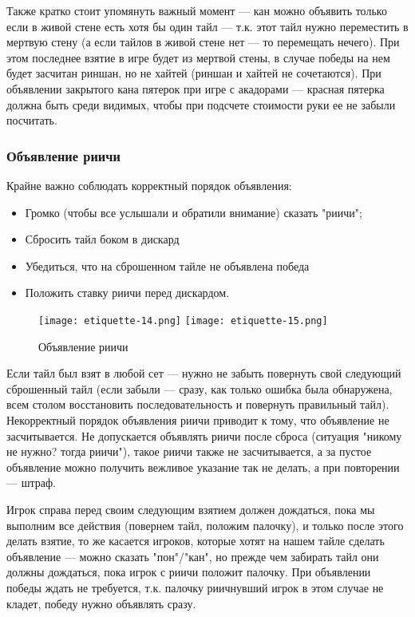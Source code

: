 Также кратко стоит упомянуть важный момент --- кан можно объявить только если в живой стене есть хотя бы один тайл --- т.к. этот тайл нужно переместить в мертвую стену (а если тайлов в живой стене нет --- то перемещать нечего). При этом последнее взятие в игре будет из мертвой стены, в случае победы на нем будет засчитан риншан, но не хайтей (риншан и хайтей не сочетаются). При объявлении закрытого кана пятерок при игре с акадорами --- красная пятерка должна быть среди видимых, чтобы при подсчете стоимости руки ее не забыли посчитать.

\subsubsection{Объявление риичи}

Крайне важно соблюдать корректный порядок объявления: 
\begin{itemize}
	\item Громко (чтобы все услышали и обратили внимание) сказать "риичи";
	\item Сбросить тайл боком в дискард
	\item Убедиться, что на сброшенном тайле не объявлена победа
	\item Положить ставку риичи перед дискардом.
\end{itemize}

\begin{figure}[H]
	\centering
	\texttt{[image: etiquette-14.png]}
	\texttt{[image: etiquette-15.png]}
	\caption{Объявление риичи}
\end{figure}

Если тайл был взят в любой сет --- нужно не забыть повернуть свой следующий сброшенный тайл (если забыли --- сразу, как только ошибка была обнаружена, всем столом восстановить последовательность и повернуть правильный тайл). Некорректный порядок объявления риичи приводит к тому, что объявление не засчитывается. Не допускается объявлять риичи после сброса (ситуация "никому не нужно? тогда риичи"), такое риичи также не засчитывается, а за пустое объявление можно получить вежливое указание так не делать, а при повторении --- штраф. 

Игрок справа перед своим следующим взятием должен дождаться, пока мы выполним все действия (повернем тайл, положим палочку), и только после этого делать взятие, то же касается игроков, которые хотят на нашем тайле сделать объявление --- можно сказать "пон"/"кан", но прежде чем забирать тайл они должны дождаться, пока игрок с риичи положит палочку. При объявлении победы ждать не требуется, т.к. палочку риичнувший игрок в этом случае не кладет, победу нужно объявлять сразу.

